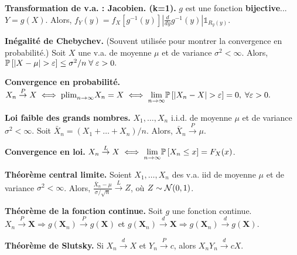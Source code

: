 \textbf{Transformation de v.a. : Jacobien. (k=1).} $g$ est une fonction \textbf{bijective}... $Y=g(X)$. Alors, $f_Y(y) = f_X[g^{-1}(y)]\left|\frac{d}{dy}g^{-1}(y)\right|\mathds{1}_{R_y(y)}$.

\textbf{Inégalité de Chebychev.} (Souvent utilisée pour montrer la convergence en probabilité.) Soit $X$ une v.a. de moyenne $\mu$ et de variance $\sigma^2< \infty$. Alors, $\mathbb{P}\left[{|X-\mu| > \varepsilon }\right] \le\sigma^2/n \; \forall \; \varepsilon > 0.$

\textbf{Convergence en probabilité.} $X_n \overset{P}{\rightarrow} X \iff \text{plim}_{n \to \infty} X_n = X \iff \underset{n \to \infty}{\lim} \mathbb{P}\left[{|X_n-X| > \varepsilon}\right] = 0, \; \forall \varepsilon > 0.$

\textbf{Loi faible des grands nombres.} $X_1, \dots, X_n$ i.i.d. de moyenne $\mu$ et de variance $\sigma^2 < \infty$. Soit $\bar{X}_n=(X_1+\dots+X_n)/n$. Alors, $\bar{X}_n \overset{P}{\to} \mu$.

\textbf{Convergence en loi.} $X_n \overset{L}{\to} X \iff \underset{n \to \infty}{\lim} \mathbb{P}\left[{X_n \le x}\right] = F_X(x)$.

\textbf{Théorème central limite.} Soient $X_1, \dots, X_n$ des v.a. iid de moyenne $\mu$ et de variance $\sigma^2 < \infty$. Alors, $\frac{\bar{X}_n - \mu}{\sigma/\sqrt{n}} \overset{L}{\to} Z$, où $Z \sim \mathcal{N}(0,1)$.

\textbf{Théorème de la fonction continue.} Soit $g$ une fonction continue. $X_n \overset{P}{\rightarrow} \mathbf{X} \Rightarrow g(\mathbf{X}_n) \overset{P}{\rightarrow} g(\mathbf{X})$ et  $g(\mathbf{X}_n) \overset{d}{\rightarrow} \mathbf{X} \Rightarrow g(\mathbf{X}_n) \overset{d}{\rightarrow} g(\mathbf{X})$.

\textbf{Théorème de Slutsky.} Si $X_n \overset{d}{\rightarrow} X$ et $ Y_n \overset{P}{\rightarrow} c$, alors $X_nY_n \overset{d}{\to} cX$.

